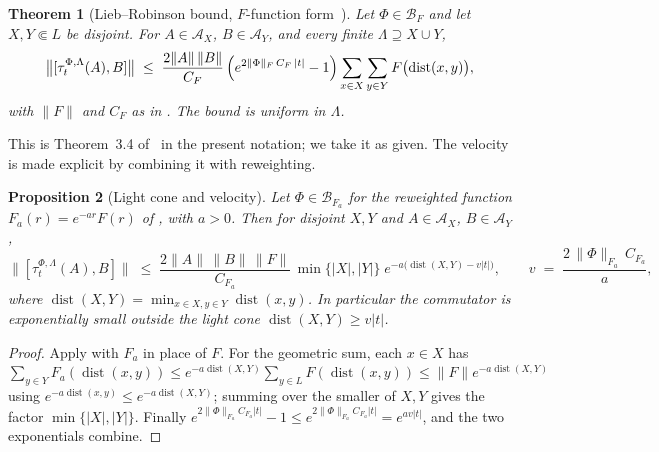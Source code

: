 \documentclass[12pt]{article}
\newcommand{\Ffun}{F}                          %
\newcommand{\BF}{\mathcal{B}_{F}}              %
\newcommand{\qA}{\mathcal{A}}
\newcommand{\norm}[1]{\lVert #1\rVert}
\newcommand{\Fnorm}[1]{\lVert #1\rVert_{F}}
\newcommand{\Fanorm}[1]{\lVert #1\rVert_{F_a}}
\newcommand{\dist}{\operatorname{dist}}
\newtheorem{theorem}{Theorem}[section]
\newtheorem{proposition}[theorem]{Proposition}
\theoremstyle{definition}
\theoremstyle{remark}
\begin{document}
\begin{theorem}[Lieb--Robinson bound, $\Ffun$-function form~\cite{nsy-quasilocality-1}]
\label{thm:lr-bound}
Let $\Phi\in\BF$ and let $X,Y\Subset L$ be disjoint. For $A\in\qA_X$, $B\in\qA_Y$, and every
finite $\Lambda\supseteq X\cup Y$,
\[
  \bigl\lVert[\tau^{\Phi,\Lambda}_t(A),B]\bigr\rVert
  \;\le\;\frac{2\norm{A}\,\norm{B}}{C_\Ffun}\,
    \Bigl(e^{2\Fnorm{\Phi}\,C_\Ffun\,\lvert t\rvert}-1\Bigr)
    \sum_{x\in X}\sum_{y\in Y}\Ffun\bigl(\dist(x,y)\bigr),
\]
with $\norm{\Ffun}$ and $C_\Ffun$ as in . The bound is uniform in $\Lambda$.
\end{theorem}

This is Theorem~3.4 of~\cite{nsy-quasilocality-1} in the present notation; we take it as
given. The velocity is made explicit by combining it with reweighting.

\begin{proposition}[Light cone and velocity]
\label{prop:velocity}
Let $\Phi\in\mathcal B_{\Ffun_a}$ for the reweighted function $\Ffun_a(r)=e^{-ar}\Ffun(r)$ of
, with $a>0$. Then for disjoint $X,Y$ and $A\in\qA_X$, $B\in\qA_Y$,
\[
  \bigl\lVert[\tau^{\Phi,\Lambda}_t(A),B]\bigr\rVert
  \;\le\;\frac{2\norm{A}\,\norm{B}\,\norm{\Ffun}}{C_{\Ffun_a}}\,
    \min\{\lvert X\rvert,\lvert Y\rvert\}\;
    e^{-a\bigl(\dist(X,Y)-v\lvert t\rvert\bigr)},
    \qquad v \;=\; \frac{2\,\Fanorm{\Phi}\,C_{\Ffun_a}}{a},
\]
where $\dist(X,Y)=\min_{x\in X,y\in Y}\dist(x,y)$. In particular the commutator is
exponentially small outside the light cone $\dist(X,Y)\ge v\lvert t\rvert$.
\end{proposition}
\begin{proof}
Apply  with $\Ffun_a$ in place of $\Ffun$. For the geometric sum, each
$x\in X$ has $\sum_{y\in Y}\Ffun_a(\dist(x,y))\le e^{-a\dist(X,Y)}\sum_{y\in
L}\Ffun(\dist(x,y))\le\norm{\Ffun}e^{-a\dist(X,Y)}$ using $e^{-a\dist(x,y)}\le
e^{-a\dist(X,Y)}$; summing over the smaller of $X,Y$ gives the factor
$\min\{\lvert X\rvert,\lvert Y\rvert\}$. Finally $e^{2\Fanorm{\Phi}C_{\Ffun_a}\lvert
t\rvert}-1\le e^{2\Fanorm{\Phi}C_{\Ffun_a}\lvert t\rvert}=e^{av\lvert t\rvert}$, and the two
exponentials combine.
\end{proof}
\end{document}
